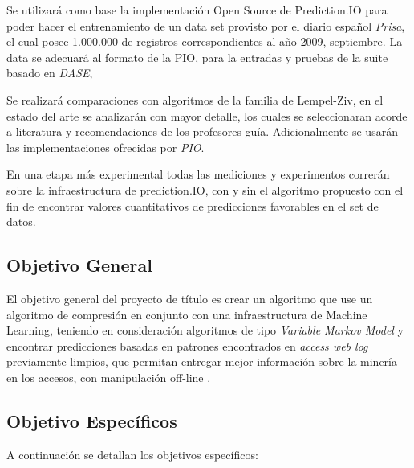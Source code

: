 \documentclass{udparticle}
\begin{document}
Se utilizará como base la implementación Open Source de Prediction.IO para poder hacer el entrenamiento de un data set provisto por el diario español \emph{Prisa}, el cual posee 1.000.000 de registros correspondientes al año 2009, septiembre. La data se adecuará al formato de la PIO, para la entradas y pruebas de la suite basado en \emph{DASE},

Se realizará comparaciones con algoritmos de la familia de Lempel-Ziv, en el estado del arte se analizarán con mayor detalle, los cuales se seleccionaran acorde a literatura y recomendaciones de los profesores guía. Adicionalmente se usarán las implementaciones ofrecidas por \emph{PIO}.

En una etapa más experimental todas las mediciones y experimentos correrán sobre la infraestructura de prediction.IO, con y sin el algoritmo propuesto con el fin de encontrar valores cuantitativos de predicciones favorables en el set de datos.


\subsection{Objetivo General}
 
	El objetivo general del proyecto de título es crear un algoritmo que use un algoritmo de compresión en conjunto con una infraestructura de Machine Learning, teniendo en consideración algoritmos de tipo \emph{Variable Markov Model} y encontrar predicciones basadas en patrones encontrados en \emph{access web log} previamente limpios, que permitan entregar mejor información sobre la minería en los accesos, con manipulación off-line .
 
\subsection{Objetivo  Específicos }
 
A continuación se detallan los objetivos específicos:
 
\end{document}
